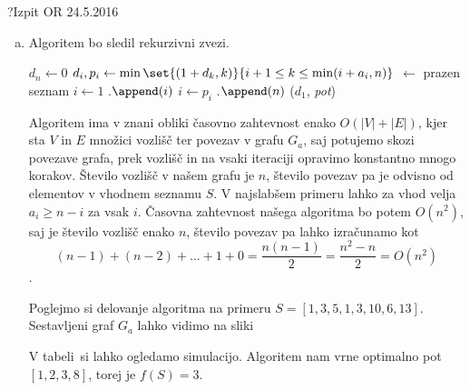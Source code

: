 \begin{naloga}{?}{Izpit OR 24.5.2016}
\begin{odgovor}
\begin{enumerate}[(a)]
\item Algoritem bo sledil rekurzivni zvezi.

\begin{small}
\begin{algorithmic}
	\State $d_n \gets 0$
		\State $d_i, p_i \gets
            \min\set{(1+d_k, k)}{i+1 \le k \le \min(i+a_i, n)}$
	\EndFor
	 $\gets$ prazen seznam
	\State $i \gets 1$
		.$\append(i)$
		\State $i \gets p_i$
	\EndWhile
    .$\append(n)$
	\State \Return ($d_1$, {\sl pot})
\EndFunction
\end{algorithmic}
\end{small}

Algoritem ima v znani obliki časovno zahtevnost enako $O(|V| + |E|)$, kjer sta $V$ in $E$ množici vozlišč ter povezav v grafu $G_a$, 
saj potujemo skozi povezave grafa, prek vozlišč in na vsaki iteraciji opravimo konstantno mnogo korakov.
Število vozlišč v našem grafu je $n$, število povezav pa je odvisno od elementov v vhodnem seznamu $S$.
V najslabšem primeru lahko za vhod velja $a_i \ge n-i$ za vsak $i$.
Časovna zahtevnost našega algoritma bo potem $O(n^2)$,
saj je število vozlišč enako $n$,
število povezav pa lahko izračunamo kot
$$
(n - 1) + (n - 2) + \dots + 1 + 0 = \frac{n (n - 1)}{2}
= \frac{n ^2 - n}{2} = O(n^2)
$$.

Poglejmo si delovanje algoritma na primeru $S = [1,3,5,1,3,10,6,13]$.
Sestavljeni graf $G_a$ lahko vidimo na sliki~\fig

\begin{slika}
\pgfslika
{}
\end{slika}

V tabeli~\tab si lahko ogledamo simulacijo.
Algoritem nam vrne optimalno pot $[1, 2, 3, 8]$, torej je $f(S) = 3$.


\end{enumerate}
\end{odgovor}
\end{naloga}
